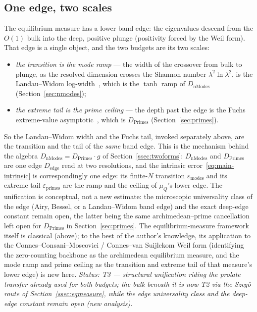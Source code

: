 \documentclass[11pt,a4paper]{article}
\begin{document}
\subsection{One edge, two scales}\label{ssec:oneedge}

The equilibrium measure has a lower band edge: the eigenvalues descend from the
$O(1)$ bulk into the deep, positive plunge (positivity forced by the Weil form).
That edge is a single object, and the two budgets are its two scales:
\begin{itemize}
\item \emph{the transition is the mode ramp} --- the width of the crossover from
  bulk to plunge, as the resolved dimension crosses the Shannon number
  $\lambda^2\ln\lambda^2$, is the Landau--Widom log-width~\cite{LandauWidom1980},
  which is the $\tanh$ ramp of $D_{\mathrm{nModes}}$ (Section~\ref{sec:nmodes});
\item \emph{the extreme tail is the prime ceiling} --- the depth past the edge is
  the Fuchs extreme-value asymptotic~\cite{Fuchs1964}, which is
  $D_{\mathrm{Primes}}$ (Section~\ref{sec:primes}).
\end{itemize}
So the Landau--Widom width and the Fuchs tail, invoked separately above, are the
transition and the tail of the \emph{same} band edge. This is the mechanism
behind the algebra $D_{\mathrm{nModes}}=D_{\mathrm{Primes}}\cdot g$ of
Section~\ref{ssec:twoforms}: $D_{\mathrm{nModes}}$ and $D_{\mathrm{Primes}}$ are
one edge $D_{\mathrm{edge}}$ read at two resolutions, and the intrinsic
error~\eqref{eq:main-intrinsic} is correspondingly one edge: its
finite-$N$ transition $\varepsilon_{\mathrm{modes}}$ and its extreme tail
$\varepsilon_{\mathrm{primes}}$ are the ramp and the ceiling of $\mu_Q$'s lower
edge. The unification is conceptual, not a new estimate: the microscopic
universality class of the edge (Airy, Bessel, or a Landau--Widom band edge) and
the exact deep-edge constant remain open, the latter being the same
archimedean--prime cancellation left open for $D_{\mathrm{Primes}}$ in
Section~\ref{sec:primes}. The equilibrium-measure framework itself is classical
(above); to the best of the author's knowledge, its application to the
Connes--Consani--Moscovici / Connes--van Suijlekom Weil form (identifying the
zero-counting backbone as the archimedean equilibrium measure, and the mode ramp
and prime ceiling as the transition and extreme tail of that measure's lower
edge) is new here. \emph{Status: T3 --- structural unification riding the
prolate transfer already used for both budgets; the bulk beneath it is now T2
via the Szeg\H{o} route of Section~\ref{ssec:eqmeasure}, while the edge
universality class and the deep-edge constant remain open (new analysis).}
\end{document}
